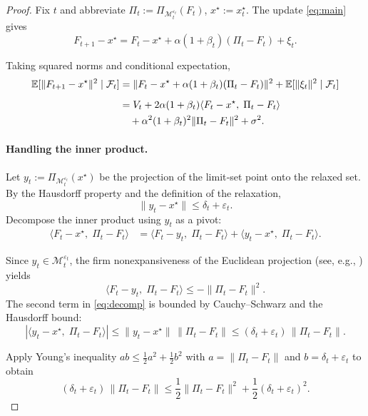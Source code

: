 \documentclass[11pt]{article}
\begin{document}
\begin{proof}
Fix \(t\) and abbreviate \(\Pi_t := \Pi_{\mathcal{M}_t^{\varepsilon_t}}(F_t)\), \(x^\star := x_t^\star\). The update \eqref{eq:main} gives
\[
F_{t+1} - x^\star = F_t - x^\star + \alpha(1+\beta_t)(\Pi_t - F_t) + \xi_t .
\]

Taking squared norms and conditional expectation,
\begin{align}
\mathbb{E}[\|F_{t+1}-x^\star\|^2 \mid \mathcal{F}_t]
&= \|F_t - x^\star + \alpha(1+\beta_t)(\Pi_t - F_t)\|^2
   + \mathbb{E}[\|\xi_t\|^2 \mid \mathcal{F}_t]\notag\\[2mm]
&= V_t
   + 2\alpha(1+\beta_t)\langle F_t - x^\star,\; \Pi_t - F_t \rangle \notag\\
&\quad + \alpha^2(1+\beta_t)^2 \|\Pi_t - F_t\|^2
   + \sigma^2 . \label{eq:expanded}
\end{align}

\paragraph{Handling the inner product.}
Let \(y_t := \Pi_{\mathcal{M}_t^{\varepsilon_t}}(x^\star)\) be the projection of the limit‑set point onto the relaxed set. By the Hausdorff property and the definition of the relaxation,
\[
\|y_t - x^\star\| \le \delta_t + \varepsilon_t .
\]
Decompose the inner product using \(y_t\) as a pivot:
\begin{align}
\langle F_t - x^\star,\; \Pi_t - F_t \rangle
&= \langle F_t - y_t,\; \Pi_t - F_t \rangle
   + \langle y_t - x^\star,\; \Pi_t - F_t \rangle . \label{eq:decomp}
\end{align}

Since \(y_t \in \mathcal{M}_t^{\varepsilon_t}\), the firm nonexpansiveness of the Euclidean projection (see, e.g., \cite{bauschke2011convex}) yields
\begin{equation}\label{eq:firm}
\langle F_t - y_t,\; \Pi_t - F_t \rangle \le -\|\Pi_t - F_t\|^2 .
\end{equation}
The second term in \eqref{eq:decomp} is bounded by Cauchy–Schwarz and the Hausdorff bound:
\[
|\langle y_t - x^\star,\; \Pi_t - F_t \rangle|
\le \|y_t - x^\star\|\, \|\Pi_t - F_t\|
\le (\delta_t + \varepsilon_t)\,\|\Pi_t - F_t\| .
\]

Apply Young's inequality \(ab \le \frac12 a^2 + \frac12 b^2\) with \(a = \|\Pi_t - F_t\|\) and \(b = \delta_t + \varepsilon_t\) to obtain
\[
(\delta_t + \varepsilon_t)\,\|\Pi_t - F_t\|
\le \frac12\|\Pi_t - F_t\|^2 + \frac12(\delta_t + \varepsilon_t)^2 .
\]


\end{proof}
\end{document}

